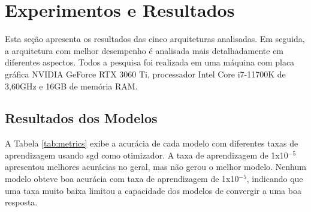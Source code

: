 \chapter{Experimentos e Resultados}\label{cap:resultados}
Esta seção apresenta os resultados das cinco arquiteturas analisadas. 
Em seguida, a arquitetura com melhor desempenho é analisada mais detalhadamente em diferentes aspectos.
Todos a pesquisa foi realizada em uma máquina com placa gráfica NVIDIA GeForce RTX 3060 Ti, processador Intel Core i7-11700K de 3,60GHz e 16GB de memória RAM.
\section{Resultados dos Modelos}\label{sec:modelsresults}


A Tabela \ref{tab:metrics} exibe a acurácia de cada modelo com diferentes taxas de aprendizagem usando \acrshort{sgd} como otimizador.
A taxa de aprendizagem de 1x10$^{-5}$ apresentou melhores acurácias no geral, mas não gerou o melhor modelo.
Nenhum modelo obteve boa acurácia com taxa de aprendizagem de 1x10$^{-5}$, indicando que uma taxa muito baixa limitou a capacidade dos modelos de convergir a uma boa resposta.

